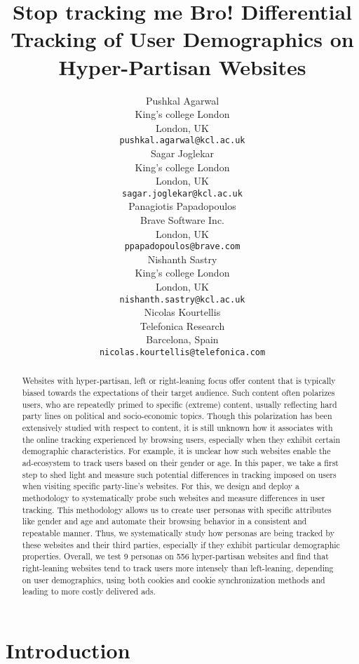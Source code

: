 \documentclass{article}
\title{Stop tracking me Bro! Differential Tracking of User Demographics on Hyper-Partisan Websites}
\author{
      Pushkal Agarwal\\
      King's college London\\
      London, UK\\
      \texttt{pushkal.agarwal@kcl.ac.uk} \\
       \And
    Sagar Joglekar\\
    King's college London\\
    London, UK\\
    \texttt{sagar.joglekar@kcl.ac.uk} \\
     \And
    Panagiotis Papadopoulos\\
    Brave Software Inc.\\
    London, UK\\
    \texttt{ppapadopoulos@brave.com} \\
     \And
    Nishanth Sastry\\
    King's college London\\
    London, UK\\
    \texttt{nishanth.sastry@kcl.ac.uk} \\
     \And
    Nicolas Kourtellis\\
    Telefonica Research\\
    Barcelona, Spain\\
    \texttt{nicolas.kourtellis@telefonica.com} \\
}
\begin{document}
\maketitle

\begin{abstract}
Websites with hyper-partisan, left or right-leaning focus offer content that is typically biased towards the expectations of their target audience.
Such content often polarizes users, who are repeatedly primed to specific (extreme) content, usually reflecting hard party lines on political and socio-economic topics.
Though this polarization has been extensively studied with respect to content, it is still unknown how it associates with the online tracking experienced by browsing users, especially when they exhibit certain demographic characteristics.
For example, it is unclear how such websites enable the ad-ecosystem to track users based on their gender or age.
In this paper, we take a first step to shed light and measure such potential differences in tracking imposed on users when visiting specific party-line's websites.
For this, we design and deploy a methodology to systematically probe such websites and measure differences in user tracking.
This methodology allows us to create user personas with specific attributes like gender and age and automate their browsing behavior in a consistent and repeatable manner.
Thus, we systematically study how personas are being tracked by these websites and their third parties, especially if they exhibit particular demographic properties.
Overall, we test 9 personas on 556 hyper-partisan websites and find that right-leaning websites tend to track users more intensely than left-leaning, depending on user demographics, using both cookies and cookie synchronization methods and leading to more costly delivered ads.
\end{abstract}




\section{Introduction}
\label{sec:introduction}
\end{document}
